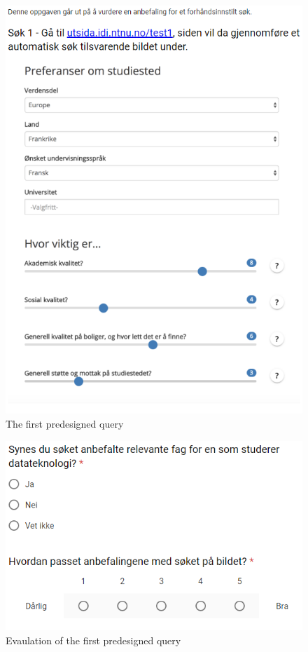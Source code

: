 \begin{figure}[h]
    \centering
    \includegraphics[width=1\textwidth]{fig/form2/s7_1.PNG}
    \caption{The first predesigned query}
    \label{fig:my_label}
\end{figure}
\begin{figure}[h]
    \centering
    \includegraphics[width=1\textwidth]{fig/form2/s7_2.PNG}
    \caption{Evaulation of the first predesigned query}
    \label{fig:my_label}
\end{figure}
